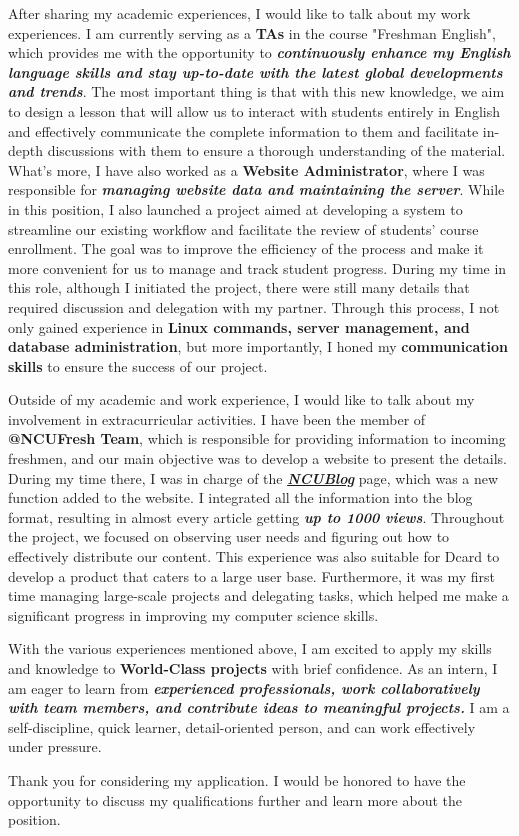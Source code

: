 After sharing my academic experiences, I would like to talk about my work experiences.
I am currently serving as a \textbf{TAs} in the course "Freshman English", which provides me with the opportunity to \textbf{\textit{continuously enhance my English language skills and stay up-to-date with the latest global developments and trends}}. The most important thing is that with this new knowledge, we aim to design a lesson that will allow us to interact with students entirely in English and effectively communicate the complete information to them and facilitate in-depth discussions with them to ensure a thorough understanding of the material. 
What's more, I have also worked as a \textbf{Website Administrator}, where I was responsible for \textbf{\textit{managing website data and maintaining the server}}. While in this position, 
I also launched a project aimed at developing a system to streamline our existing workflow and facilitate the review of students' course enrollment. The goal was to improve the efficiency of the process and make it more convenient for us to manage and track student progress. 
During my time in this role, although I initiated the project, there were still many details that required discussion and delegation with my partner. Through this process, I not only gained experience in\textbf{ Linux commands, server management, and database administration}, but more importantly, I honed my \textbf{communication skills} to ensure the success of our project.

Outside of my academic and work experience, I would like to talk about my involvement in extracurricular activities. I have been the member of \textbf{@NCUFresh Team}, which is responsible for providing information to incoming freshmen, and our main objective was to develop a website to present the details. During my time there, I was in charge of the \textbf{\textit{\href{https://ncufresh22tmp.le37.tw/blog/}{NCUBlog}}} page, which was a new function added to the website. I integrated all the information into the blog format, resulting in almost every article getting \textit{\textbf{up to 1000 views}}. Throughout the project, we focused on observing user needs and figuring out how to effectively distribute our content. This experience was also suitable for Dcard to develop a product that caters to a large user base. Furthermore, it was my first time managing large-scale projects and delegating tasks, which helped me make a significant progress in improving my computer science skills.

With the various experiences mentioned above, I am excited to apply my skills and knowledge to \textbf{World-Class projects} with brief confidence. As an intern, I am eager to learn from \textbf{\emph{experienced professionals, work collaboratively with team members, and contribute ideas to meaningful projects.}} I am a self-discipline, quick learner, detail-oriented person, and can work effectively under pressure.

Thank you for considering my application. I would be honored to have the opportunity to discuss my qualifications further and learn more about the position.

